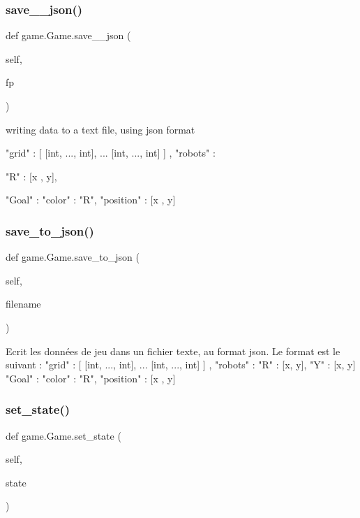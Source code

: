 \subsubsection{\texorpdfstring{save\+\_\+\_\+json()}{save\_2\_json()}}
{\footnotesize\ttfamily def game.\+Game.\+save\+\_\+\_\+json (\begin{DoxyParamCaption}\item[{}]{self,  }\item[{}]{fp }\end{DoxyParamCaption})}

\begin{DoxyVerb}writing data to a text file, using json format
{
"grid" : [ [int, ..., int],
            ...
    [int, ..., int]
    ] ,
"robots" :  {
    "R" : [x , y],

    }
"Goal" : {
    "color" : "R",
    "position" : [x , y]
    }
}
\end{DoxyVerb}
 \mbox{\label{classgame_1_1Game_a7c525e5a47b01fb5bed17fe1438c13f5}} 
\subsubsection{\texorpdfstring{save\+\_\+to\+\_\+json()}{save\_to\_json()}}
{\footnotesize\ttfamily def game.\+Game.\+save\+\_\+to\+\_\+json (\begin{DoxyParamCaption}\item[{}]{self,  }\item[{}]{filename }\end{DoxyParamCaption})}

\begin{DoxyVerb}Ecrit les données de jeu dans un fichier texte, au format json.
Le format est le suivant :
{
"grid" : [ [int, ..., int],
            ...
    [int, ..., int]
    ] ,
"robots" :  {
    "R" : [x, y],
    "Y" : [x, y]
    }
"Goal" : {
    "color" : "R",
    "position" : [x , y]
    }
}
\end{DoxyVerb}
 \mbox{\label{classgame_1_1Game_a7e87798fb7f81b80c11fcaec17860577}} 
\subsubsection{\texorpdfstring{set\+\_\+state()}{set\_state()}}
{\footnotesize\ttfamily def game.\+Game.\+set\+\_\+state (\begin{DoxyParamCaption}\item[{}]{self,  }\item[{}]{state }\end{DoxyParamCaption})}

